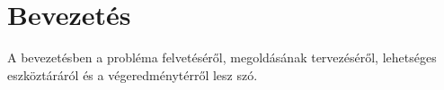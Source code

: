 \chapter{Bevezetés}
A bevezetésben a probléma felvetéséről, megoldásának tervezéséről, lehetséges eszköztáráról és a végeredménytérről lesz szó.
